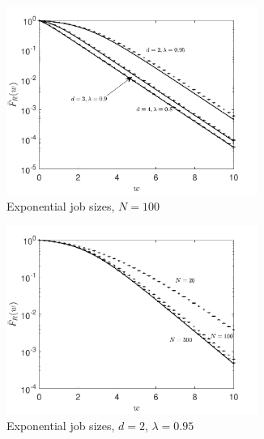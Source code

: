 \documentclass[12pt]{report}
\begin{document}
\begin{figure}[t]
\begin{center}
\begin{subfigure}{.45\textwidth}
\centering
\includegraphics[width=0.9\textwidth]{figures/Chapter2/fig3_6a.pdf}
\caption{Exponential job sizes, $N = 100$}
\label{fig:validateEXP_LLd}
\end{subfigure}
\begin{subfigure}{.45\textwidth}
\centering
\includegraphics[width=0.9\textwidth]{figures/Chapter2/fig3_6b.pdf}
\caption{Exponential job sizes, $d = 2$, $\lambda = 0.95$}
\label{fig:validateEXP2_LLd}
\end{subfigure}
\vspace*{4mm}
\begin{subfigure}{.45\textwidth}
\centering

\end{subfigure}
\end{center}
\end{figure}
\end{document}
